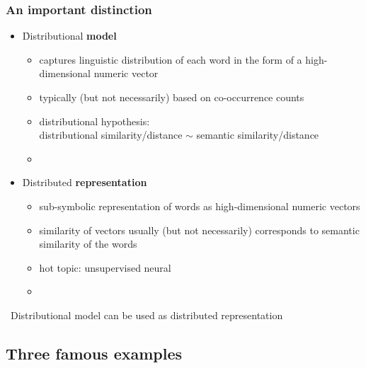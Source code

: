 \documentclass[t]{beamer} %
\begin{document}
\begin{frame}
  \frametitle{An important distinction}

  \begin{itemize}
  \item<1-> \h{Distributional} \textbf{model}
    \begin{itemize}
    \item captures linguistic distribution of each word in the form of a high-dimensional numeric vector
    \item typically (but not necessarily) based on co-occurrence counts
    \item distributional hypothesis:\\
      distributional similarity/distance $\sim$ semantic similarity/distance
    \item[]
    \end{itemize}
  \item<2-> \h{Distributed} \textbf{representation}
    \begin{itemize}
    \item sub-symbolic representation of words as high-dimensional numeric vectors
    \item similarity of vectors usually (but not necessarily) corresponds to semantic similarity of the words
    \item hot topic: unsupervised neural 
    \item[]
    \end{itemize}
  \end{itemize}
  
  \hand\ Distributional model can be used as distributed representation

\end{frame}

\subsection{Three famous examples}
\end{document}
